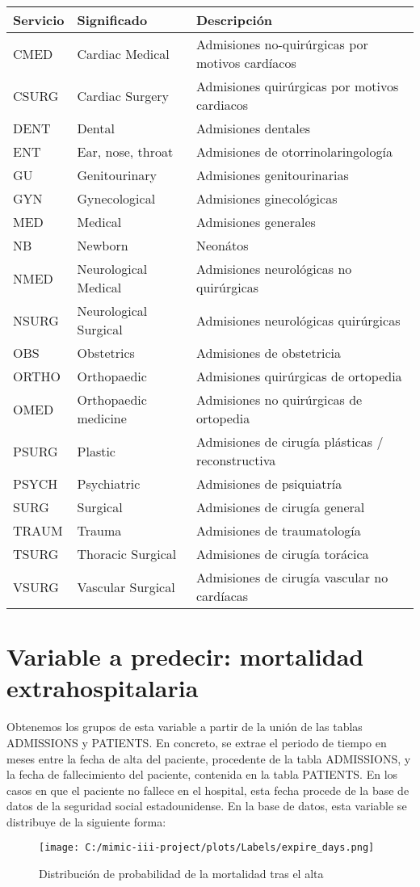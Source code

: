\documentclass{report}
\begin{document}
\begin{longtable}[]{@{}lll@{}}

\toprule
Servicio & Significado & Descripción\tabularnewline
\midrule
\endhead
CMED & Cardiac Medical & Admisiones no-quirúrgicas por motivos
cardíacos\tabularnewline
CSURG & Cardiac Surgery & Admisiones quirúrgicas por motivos
cardiacos\tabularnewline
DENT & Dental & Admisiones dentales\tabularnewline
ENT & Ear, nose, throat & Admisiones de
otorrinolaringología\tabularnewline
GU & Genitourinary & Admisiones genitourinarias\tabularnewline
GYN & Gynecological & Admisiones ginecológicas\tabularnewline
MED & Medical & Admisiones generales\tabularnewline
NB & Newborn & Neonátos\tabularnewline
NMED & Neurological Medical & Admisiones neurológicas no
quirúrgicas\tabularnewline
NSURG & Neurological Surgical & Admisiones neurológicas
quirúrgicas\tabularnewline
OBS & Obstetrics & Admisiones de obstetricia\tabularnewline
ORTHO & Orthopaedic & Admisiones quirúrgicas de ortopedia\tabularnewline
OMED & Orthopaedic medicine & Admisiones no quirúrgicas de
ortopedia\tabularnewline
PSURG & Plastic & Admisiones de cirugía plásticas /
reconstructiva\tabularnewline
PSYCH & Psychiatric & Admisiones de psiquiatría\tabularnewline
SURG & Surgical & Admisiones de cirugía general\tabularnewline
TRAUM & Trauma & Admisiones de traumatología\tabularnewline
TSURG & Thoracic Surgical & Admisiones de cirugía
torácica\tabularnewline
VSURG & Vascular Surgical & Admisiones de cirugía vascular no
cardíacas\tabularnewline

\bottomrule
\end{longtable}
\newpage

\section{Variable a predecir: mortalidad extrahospitalaria}

Obtenemos los grupos de esta variable a partir de la unión de las tablas ADMISSIONS y PATIENTS. En concreto, se extrae el periodo de tiempo en meses entre la fecha de alta del paciente, procedente de la tabla ADMISSIONS, y la fecha de fallecimiento del paciente, contenida en la tabla PATIENTS. En los casos en que el paciente no fallece en el hospital, esta fecha procede de la base de datos de la seguridad social estadounidense. En la base de datos, esta variable se distribuye de la siguiente forma:

\begin{figure}[h]
\centering
\texttt{[image: C:/mimic-iii-project/plots/Labels/expire\_days.png]}
\caption{Distribución de probabilidad de la mortalidad tras el alta}
\end{figure}
\end{document}
